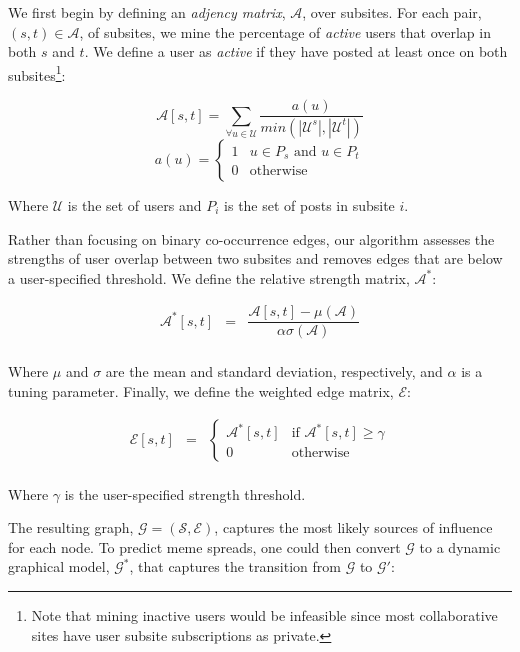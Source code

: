\documentclass{article} %
\begin{document}
We first begin by defining an \textit{adjency matrix}, $\mathcal{A}$, over subsites. For each pair, $(s,t) \in \mathcal{A}$, of subsites, we mine the percentage of \textit{active} users that overlap in both $s$ and $t$. We define a user as \textit{active} if they have posted at least once on both subsites\footnote{Note that mining inactive users would be infeasible since most collaborative sites have user subsite subscriptions as private.}:

$$
\mathcal{A}[s,t] = \sum_{\forall u \in \mathcal{U}}\dfrac{a(u)}{min(|\mathcal{U}^s|,|\mathcal{U}^t|)}$$
$$
a(u) = \begin{cases}1&u \in P_s\text{ and }u \in P_t\\0 &\text{otherwise}\end{cases}
$$

Where $\mathcal{U}$ is the set of users and $P_i$ is the set of posts in subsite $i$.

Rather than focusing on binary co-occurrence edges, our algorithm assesses the strengths of user overlap between two subsites and removes edges that are below a user-specified threshold. We define the relative strength matrix, $\mathcal{A}^*$:

$$
\begin{array}{lll}
\mathcal{A}^*[s,t] &=& \dfrac{\mathcal{A}[s,t] - \mu(\mathcal{A})}{\alpha\sigma(\mathcal{A})}\\
\end{array}
$$

Where $\mu$ and $\sigma$ are the mean and standard deviation, respectively, and $\alpha$ is a tuning parameter. Finally, we define the weighted edge matrix, $\mathcal{E}$:

$$
\begin{array}{lll}
\mathcal{E}[s,t] &=& \begin{cases}\mathcal{A}^*[s,t] & \text{if }\mathcal{A}^*[s,t] \geq \gamma \\0 &\text{otherwise}\end{cases}\\
\end{array}
$$

Where $\gamma$ is the user-specified strength threshold.

The resulting graph, $\mathcal{G} = (\mathcal{S},\mathcal{E})$, captures the most likely sources of influence for each node. To predict meme spreads, one could then convert $\mathcal{G}$ to a dynamic graphical model, $\mathcal{G}^*$, that captures the transition from $\mathcal{G}$ to $\mathcal{G'}$:
\end{document}
